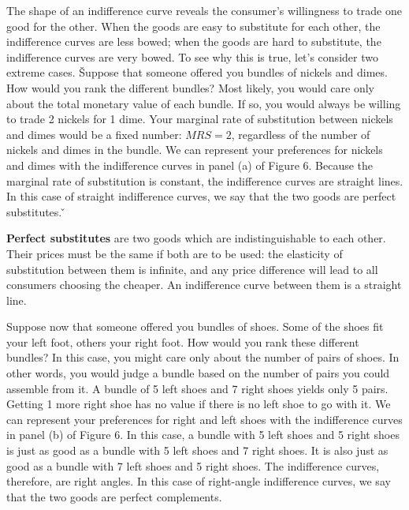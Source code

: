 \eit

The shape of an indifference curve reveals the consumer's willingness to trade one good for the other. When the goods
are easy to substitute for each other, the indifference curves are less bowed; when the goods are hard to substitute,
the indifference curves are very bowed. To see why this is true, let's consider two extreme cases. \v

Suppose that someone offered you bundles of nickels and dimes. How would you rank the different bundles? Most likely,
you would care only about the total monetary value of each bundle. If so, you would always be willing to trade 2
nickels for 1 dime. Your marginal rate of substitution between nickels and dimes would be a fixed number: $MRS = 2$,
regardless of the number of nickels and dimes in the bundle. We can represent your preferences for nickels and dimes
with the indifference curves in panel (a) of Figure 6. Because the marginal rate of substitution is constant, the
indifference curves are straight lines. In this case of straight indifference curves, we say that the two goods are
perfect substitutes. \v


\textbf{Perfect substitutes} are two goods which are indistinguishable to each other. Their prices must be the same
if both are to be used: the elasticity of substitution between them is infinite, and any price difference will lead
to all consumers choosing the cheaper. An indifference curve between them is a straight line.
\ed

Suppose now that someone offered you bundles of shoes. Some of the shoes fit your left foot, others your right foot.
How would you rank these different bundles? In this case, you might care only about the number of pairs of shoes. In
other words, you would judge a bundle based on the number of pairs you could assemble from it. A bundle of 5 left
shoes and 7 right shoes yields only 5 pairs. Getting 1 more right shoe has no value if there is no left shoe to go
with it. We can represent your preferences for right and left shoes with the indifference curves in panel (b) of
Figure 6. In this case, a bundle with 5 left shoes and 5 right shoes is just as good as a bundle with 5 left shoes
and 7 right shoes. It is also just as good as a bundle with 7 left shoes and 5 right shoes. The indifference curves,
therefore, are right angles. In this case of right-angle indifference curves, we say that the two goods are perfect
complements.

